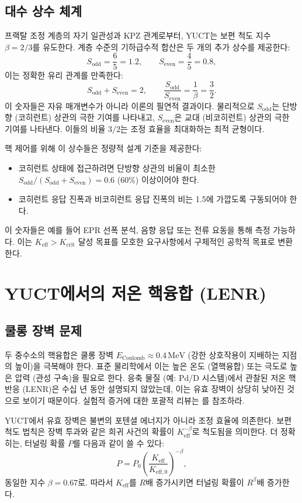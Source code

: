 \documentclass[11pt,a4paper]{article}
\theoremstyle{remark}
\newcommand{\Keff}{K_{\mathrm{eff}}}
\newcommand{\Keffzero}{K_{\mathrm{eff},0}}
\newcommand{\Kcrit}{K_{\mathrm{crit}}}
\newcommand{\Sodd}{S_{\mathrm{odd}}}
\newcommand{\Seven}{S_{\mathrm{even}}}
\begin{document}
	\subsection{대수 상수 체계}
	\label{sec:algebraic}
	
	프랙탈 조정 계층의 자기 일관성과 KPZ 관계로부터, YUCT는 보편 척도 지수 \(\beta = 2/3\)를 유도한다. 계층 수준의 기하급수적 합산은 두 개의 추가 상수를 제공한다:
	\[
	\Sodd = \frac{6}{5}=1.2,\qquad \Seven = \frac{4}{5}=0.8,
	\]
	이는 정확한 유리 관계를 만족한다:
	\[
	\Sodd + \Seven = 2,\qquad \frac{\Sodd}{\Seven} = \frac{1}{\beta} = \frac{3}{2}.
	\]
	이 숫자들은 자유 매개변수가 아니라 이론의 필연적 결과이다. 물리적으로 \(\Sodd\)는 단방향 (코히런트) 상관의 극한 기여를 나타내고, \(\Seven\)은 교대 (비코히런트) 상관의 극한 기여를 나타낸다. 이들의 비율 \(3/2\)는 조정 효율을 최대화하는 최적 균형이다.
	
	핵 제어를 위해 이 상수들은 정량적 설계 기준을 제공한다:
	\begin{itemize}
		\item 코히런트 상태에 접근하려면 단방향 상관의 비율이 최소한 \(\Sodd/(\Sodd+\Seven)=0.6\) (60\%) 이상이어야 한다.
		\item 코히런트 응답 진폭과 비코히런트 응답 진폭의 비는 1.5에 가깝도록 구동되어야 한다.
	\end{itemize}
	이 숫자들은 예를 들어 EPR 선폭 분석, 음향 응답 또는 전류 요동을 통해 측정 가능하다. 이는 \(\Keff > \Kcrit\) 달성 목표를 모호한 요구사항에서 구체적인 공학적 목표로 변환한다.
	
	\section{YUCT에서의 저온 핵융합 (LENR)}
	\label{sec:fusion}
	
	\subsection{쿨롱 장벽 문제}
	
	두 중수소의 핵융합은 쿨롱 장벽 \(E_{\text{Coulomb}} \approx 0.4\,\text{MeV}\) (강한 상호작용이 지배하는 지점의 높이)을 극복해야 한다. 표준 물리학에서 이는 높은 온도 (열핵융합) 또는 극도로 높은 압력 (관성 구속)을 필요로 한다. 응축 물질 (예: Pd/D 시스템)에서 관찰된 저온 핵반응 (LENR)은 수십 년 동안 설명되지 않았는데, 이는 유효 장벽이 상당히 낮아진 것으로 보이기 때문이다. 실험적 증거에 대한 포괄적 리뷰는 \cite{Storms2014, Nagel2019}를 참조하라.
	
	YUCT에서 유효 장벽은 불변의 포텐셜 에너지가 아니라 조정 효율에 의존한다. 보편 척도 법칙은 장벽 투과와 같은 희귀 사건의 확률이 \(\Keff^{-\beta}\)로 척도됨을 의미한다. 더 정확히는, 터널링 확률 \(P\)를 다음과 같이 쓸 수 있다:
	\begin{equation}
		P = P_0 \left( \frac{\Keff}{\Keffzero} \right)^{-\beta},
		\label{eq:tunnel}
	\end{equation}
	동일한 지수 \(\beta = 0.67\)로. 따라서 \(\Keff\)를 \(R\)배 증가시키면 터널링 확률이 \(R^{\beta}\)배 증가한다.
	
\end{document}
